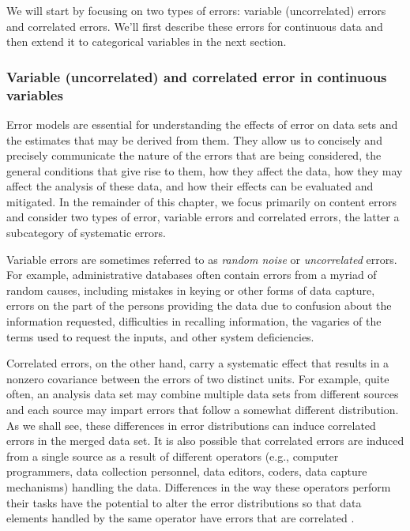 \documentclass[]{krantz}
\begin{document}
We will start by focusing on two types of errors: variable
(uncorrelated) errors and correlated errors. We'll first describe these
errors for continuous data and then extend it to categorical variables
in the next section.

\hypertarget{sec:10-4.2.1}{\subsubsection{Variable (uncorrelated) and
correlated error in continuous variables}\label{sec:10-4.2.1}}

Error models are essential for understanding the effects of error on
data sets and the estimates that may be derived from them. They allow us
to concisely and precisely communicate the nature of the errors that are
being considered, the general conditions that give rise to them, how
they affect the data, how they may affect the analysis of these data,
and how their effects can be evaluated and mitigated. In the remainder
of this chapter, we focus primarily on content errors and consider two
types of error, variable errors and correlated errors, the latter a
subcategory of systematic errors.

Variable errors are sometimes referred to as \emph{random noise} or
\emph{uncorrelated} errors. For example, administrative databases often
contain errors from a myriad of random causes, including mistakes in
keying or other forms of data capture, errors on the part of the persons
providing the data due to confusion about the information requested,
difficulties in recalling information, the vagaries of the terms used to
request the inputs, and other system deficiencies.

Correlated errors, on the other hand, carry a systematic effect that
results in a nonzero covariance between the errors of two distinct
units. For example, quite often, an analysis data set may combine
multiple data sets from different sources and each source may impart
errors that follow a somewhat different distribution. As we shall see,
these differences in error distributions can induce correlated errors in
the merged data set. It is also possible that correlated errors are
induced from a single source as a result of different operators (e.g.,
computer programmers, data collection personnel, data editors, coders,
data capture mechanisms) handling the data. Differences in the way these
operators perform their tasks have the potential to alter the error
distributions so that data elements handled by the same operator have
errors that are correlated \citep{biemer2003}.
\end{document}
